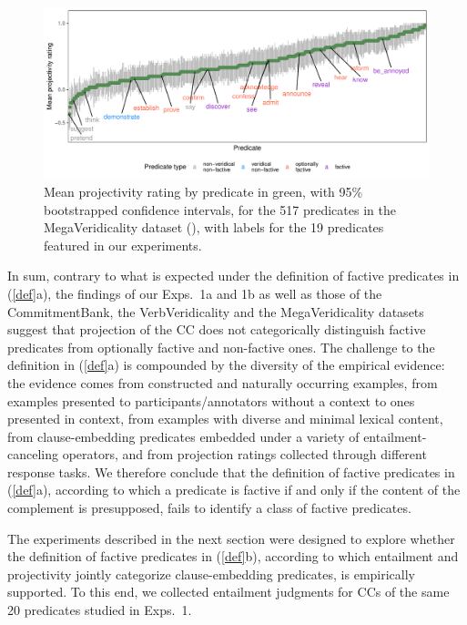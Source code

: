 \documentclass[11pt,fleqn]{article}
\newcommand{\6}{\mbox{$[\hspace*{-.6mm}[$}}
\newcommand{\9}{\mbox{$]\hspace*{-.6mm}]$}}
\begin{document}
\begin{figure}[H]
\centering
\includegraphics[width=.77\paperwidth]{../../MegaVeridicality-analysis/graphs/means-projection-by-predicate}

\caption{Mean projectivity rating by predicate in green, with 95\% bootstrapped confidence intervals, for the 517 predicates in the MegaVeridicality dataset (\citealt{white-rawlins-nels2018,white-etal2018b}), with labels for the 19 predicates featured in our experiments.}
\label{f-white-rawlins-projectivity}
\end{figure}


In sum, contrary to what is expected under the definition of factive predicates in (\ref{def}a), the findings of our Exps.~1a and 1b as well as those of the CommitmentBank, the VerbVeridicality and the MegaVeridicality datasets suggest that projection of the CC does not categorically distinguish factive predicates from optionally factive and non-factive ones. The challenge to the definition in (\ref{def}a) is compounded by the diversity of the empirical evidence: the evidence comes from constructed and naturally occurring examples, from examples presented to participants/annotators without a context to ones presented in context, from examples with diverse and minimal lexical content, from clause-embedding predicates embedded under a variety of entailment-canceling operators, and from projection ratings collected through different response tasks. We therefore conclude that the definition of factive predicates in (\ref{def}a), according to which a predicate is factive if and only if the content of the complement is presupposed, fails to identify a class of factive predicates. 

The experiments described in the next section were designed to explore whether the definition of factive predicates in (\ref{def}b), according to which entailment and projectivity jointly categorize clause-embedding predicates, is empirically supported. To this end, we collected entailment judgments for CCs of the same 20 predicates studied in Exps.~1.
\end{document}
